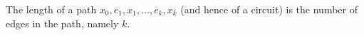 The length of a path $x_0, e_1, x_1, \ldots, e_k, x_k$ (and hence of a circuit) is the number of edges in the path, namely $k$.

